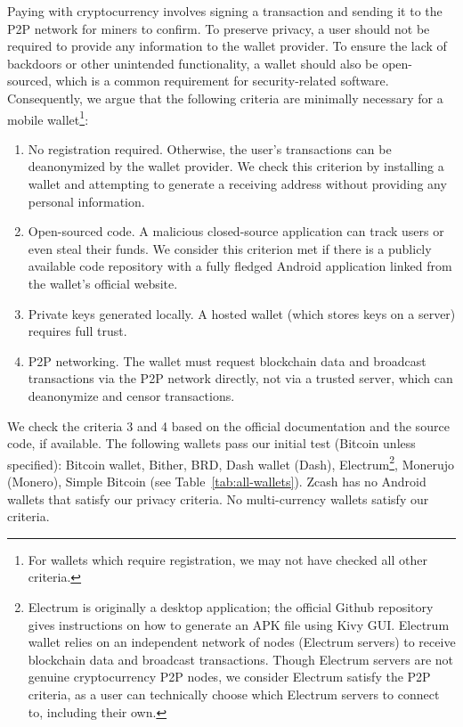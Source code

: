 Paying with cryptocurrency involves signing a transaction and sending it to the P2P network for miners to confirm.
To preserve privacy, a user should not be required to provide any information to the wallet provider.
To ensure the lack of backdoors or other unintended functionality, a wallet should also be open-sourced, which is a common requirement for security-related software.
Consequently, we argue that the following criteria are minimally necessary for a mobile wallet\footnote{For wallets which require registration, we may not have checked all other criteria.}:
\begin{enumerate}
	\item No registration required. Otherwise, the user's transactions can be deanonymized by the wallet provider. We check this criterion by installing a wallet and attempting to generate a receiving address without providing any personal information.
	\item Open-sourced code. A malicious closed-source application can track users or even steal their funds. We consider this criterion met if there is a publicly available code repository with a fully fledged Android application linked from the wallet's official website.
	\item Private keys generated locally. A hosted wallet (which stores keys on a server) requires full trust.
	\item P2P networking. The wallet must request blockchain data and broadcast transactions via the P2P network directly, not via a trusted server, which can deanonymize and censor transactions.
\end{enumerate}
We check the criteria 3 and 4 based on the official documentation and the source code, if available.
The following wallets pass our initial test (Bitcoin unless specified): Bitcoin wallet, Bither, BRD, Dash wallet (Dash), Electrum\footnote{Electrum is originally a desktop application; the official Github repository gives instructions on how to generate an APK file using Kivy GUI. Electrum wallet relies on an independent network of nodes (Electrum servers) to receive blockchain data and broadcast transactions. Though Electrum servers are not genuine cryptocurrency P2P nodes, we consider Electrum satisfy the P2P criteria, as a user can technically choose which Electrum servers to connect to, including their own.}, Monerujo (Monero), Simple Bitcoin (see Table~\ref{tab:all-wallets}).
Zcash has no Android wallets that satisfy our privacy criteria.
No multi-currency wallets satisfy our criteria.


